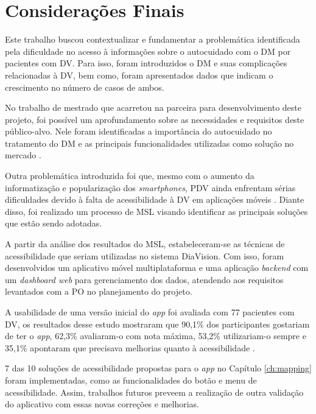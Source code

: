 \chapter{Considerações Finais}
\label{ch:conclusion}

Este trabalho buscou contextualizar e fundamentar a problemática identificada pela dificuldade
no acesso à informações sobre o autocuidado com o DM por pacientes com DV\@. Para isso, foram introduzidos
o DM e suas complicações relacionadas à DV, bem como, foram apresentados dados que indicam o crescimento no
número de casos de ambos.

No trabalho de mestrado que acarretou na parceira para desenvolvimento deste projeto, foi possível um aprofundamento
sobre as necessidades e requisitos deste público-alvo. Nele foram identificadas a importância do autocuidado
no tratamento do DM e as principais funcionalidades utilizadas como solução no mercado \cite{Sobral2021}.

Outra problemática introduzida foi que, mesmo com o aumento da informatização e popularização dos \emph{smartphones},
PDV ainda enfrentam sérias dificuldades devido à falta de acessibilidade à DV em aplicações móveis \cite{Shera2021285}.
Diante disso, foi realizado um processo de MSL visando identificar as principais soluções que estão sendo adotadas.

A partir da análise dos resultados do MSL, estabeleceram-se as técnicas de acessibilidade que seriam utilizadas
no sistema DiaVision. Com isso, foram desenvolvidos um aplicativo móvel multiplataforma e uma aplicação
\emph{backend} com um \emph{dashboard web} para gerenciamento dos dados, atendendo aos requisitos levantados
com a PO no planejamento do projeto.

A usabilidade de uma versão inicial do \emph{app} foi avaliada com 77 pacientes com DV, os resultados
desse estudo mostraram que 90,1\% dos participantes gostariam de ter o \emph{app}, 62,3\% avaliaram-o com nota
máxima, 53,2\% utilizariam-o sempre e 35,1\% apontaram que precisava melhorias quanto à acessibilidade \cite{Sobral2022}.

7 das 10 soluções de acessibilidade propostas para o \emph{app} no Capítulo \ref{ch:mapping} foram implementadas,
como as funcionalidades do botão e menu de acessibilidade. Assim, trabalhos futuros preveem a realização de outra
validação do aplicativo com essas novas correções e melhorias.